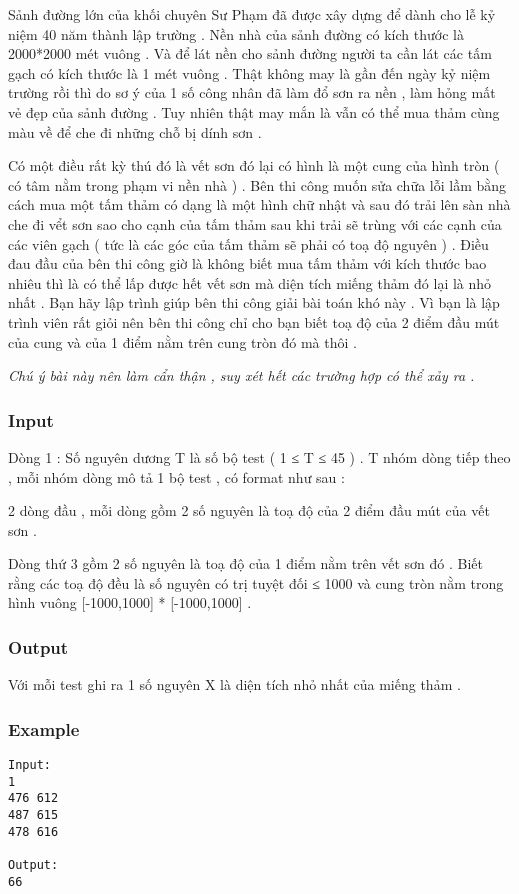 



   Sảnh đường lớn của khối chuyên Sư Phạm đã được xây dựng để dành cho lễ kỷ niệm 40 năm thành lập trường . Nền nhà của sảnh đường có kích thước là 2000*2000 mét vuông . Và để lát nền cho sảnh đường người ta cần lát các tấm gạch có kích thước là 1 mét vuông . Thật không may là gần đến ngày kỷ niệm trường rồi thì do sơ ý của 1 số công nhân đã làm đổ sơn ra nền , làm hỏng mất vẻ đẹp của sảnh đường . Tuy nhiên thật may mắn là vẫn có thể mua thảm cùng màu về để che đi những chỗ bị dính sơn .   


   Có một điều rất kỳ thú đó là vết sơn đó lại có hình là một cung của hình tròn ( có tâm nằm trong phạm vi nền nhà ) . Bên thi công muốn sửa chữa lỗi lầm bằng cách mua một tấm thảm có dạng là một hình chữ nhật và sau đó trải lên sàn nhà che đi vểt sơn sao cho cạnh của tấm thảm sau khi trải sẽ trùng với các cạnh của các viên gạch ( tức là các góc của tấm thảm sẽ phải có toạ độ nguyên ) . Điều đau đầu của bên thi công giờ là không biết mua tấm thảm với kích thước bao nhiêu thì là có thể lấp được hết vết sơn mà diện tích miếng thảm đó lại là nhỏ nhất . Bạn hãy lập trình giúp bên thi công giải bài toán khó này . Vì bạn là lập trình viên rất giỏi nên bên thi công chỉ cho bạn biết toạ độ của 2 điểm đầu mút của cung và của 1 điểm nằm trên cung tròn đó mà thôi .   





\textit{    Chú ý bài này nên làm cẩn thận , suy xét hết các trường hợp có thể xảy ra .   }

\subsubsection{   Input  }

   Dòng 1 : Số nguyên dương T là số bộ test ( 1 ≤ T ≤ 45 ) . T nhóm dòng tiếp theo , mỗi nhóm dòng mô tả 1 bộ test , có format như sau :   


   2 dòng đầu , mỗi dòng gồm 2 số nguyên là toạ độ của 2 điểm đầu mút của vết sơn .   


   Dòng thứ 3 gồm 2 số nguyên là toạ độ của 1 điểm nằm trên vết sơn đó . Biết rằng các toạ độ đều là số nguyên có trị tuyệt đối ≤ 1000 và cung tròn nằm trong hình vuông [-1000,1000] * [-1000,1000] .  

\subsubsection{   Output  }

   Với mỗi test ghi ra 1 số nguyên X là diện tích nhỏ nhất của miếng thảm .  

\subsubsection{   Example  }
\begin{verbatim}
Input:
1
476 612
487 615
478 616

Output:
66
\end{verbatim}
